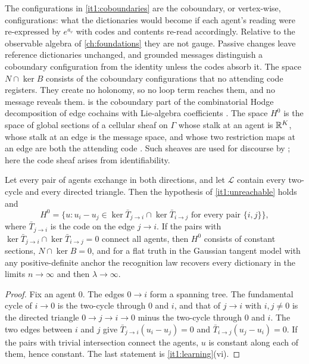 The configurations in \cref{it1:coboundaries} are the coboundary, or vertex-wise, configurations: what the dictionaries would become if each agent's reading were re-expressed by $e^{a_v}$ with codes and contents re-read accordingly. Relative to the observable algebra of \cref{ch:foundations} they are not gauge. Passive changes leave reference dictionaries unchanged, and grounded messages distinguish a coboundary configuration from the identity unless the codes absorb it. The space $N\cap\ker B$ consists of the coboundary configurations that no attending code registers. They create no holonomy, so no loop term reaches them, and no message reveals them.  is the coboundary part of the combinatorial Hodge decomposition of edge cochains with Lie-algebra coefficients \citep{Lim2020}. The space $H^0$ is the space of global sections of a cellular sheaf on $\Gamma$ whose stalk at an agent is $\mathbb R^K$, whose stalk at an edge is the message space, and whose two restriction maps at an edge are both the attending code \citep{HansenGhrist2019}. Such sheaves are used for discourse by \citet{HansenGhrist2021}; here the code sheaf arises from identifiability.

Let every pair of agents exchange in both directions, and let $\mathcal L$ contain every two-cycle and every directed triangle. Then the hypothesis of \cref{it1:unreachable} holds and
\begin{equation}
H^0=\bigl\{u:u_i-u_j\in\ker\bar T_{j\to i}\cap\ker\bar T_{i\to j}\text{ for every pair }\{i,j\}\bigr\},
\end{equation}
where $\bar T_{j\to i}$ is the code on the edge $j\to i$. If the pairs with $\ker\bar T_{j\to i}\cap\ker\bar T_{i\to j}=0$ connect all agents, then $H^0$ consists of constant sections, $N\cap\ker B=0$, and for a flat truth in the Gaussian tangent model with any positive-definite anchor the recognition law recovers every dictionary in the limits $n\to\infty$ and then $\lambda\to\infty$.
\begin{proof}
Fix an agent $0$. The edges $0\to i$ form a spanning tree. The fundamental cycle of $i\to0$ is the two-cycle through $0$ and $i$, and that of $j\to i$ with $i,j\neq0$ is the directed triangle $0\to j\to i\to0$ minus the two-cycle through $0$ and $i$. The two edges between $i$ and $j$ give $\bar T_{j\to i}(u_i-u_j)=0$ and $\bar T_{i\to j}(u_j-u_i)=0$. If the pairs with trivial intersection connect the agents, $u$ is constant along each of them, hence constant. The last statement is \cref{it1:learning}(vi).
\end{proof}

